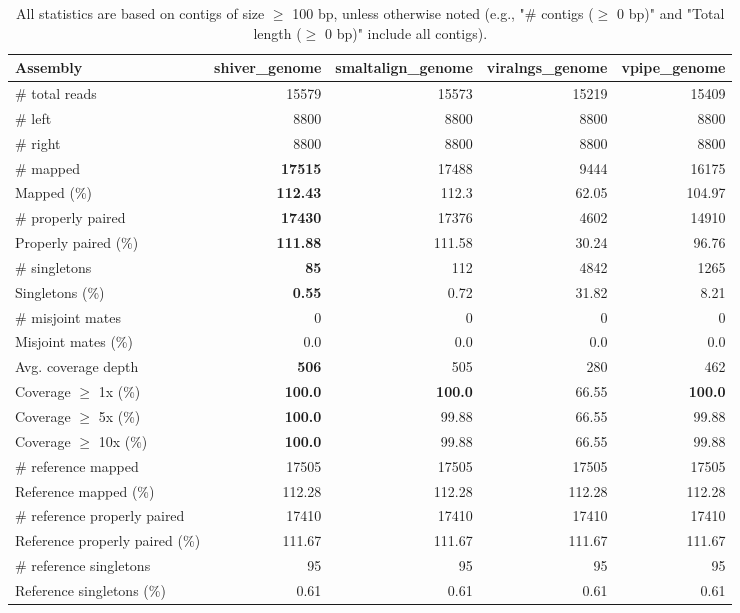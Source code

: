 \documentclass[12pt,a4paper]{article}
\begin{document}
\begin{table}[ht]
\begin{center}
\caption{All statistics are based on contigs of size $\geq$ 100 bp, unless otherwise noted (e.g., "\# contigs ($\geq$ 0 bp)" and "Total length ($\geq$ 0 bp)" include all contigs).}
\begin{tabular}{|l*{4}{|r}|}
\hline
Assembly & shiver\_genome & smaltalign\_genome & viralngs\_genome & vpipe\_genome \\ \hline
\# total reads & 15579 & 15573 & 15219 & 15409 \\ \hline
\# left & 8800 & 8800 & 8800 & 8800 \\ \hline
\# right & 8800 & 8800 & 8800 & 8800 \\ \hline
\# mapped & {\bf 17515} & 17488 & 9444 & 16175 \\ \hline
Mapped (\%) & {\bf 112.43} & 112.3 & 62.05 & 104.97 \\ \hline
\# properly paired & {\bf 17430} & 17376 & 4602 & 14910 \\ \hline
Properly paired (\%) & {\bf 111.88} & 111.58 & 30.24 & 96.76 \\ \hline
\# singletons & {\bf 85} & 112 & 4842 & 1265 \\ \hline
Singletons (\%) & {\bf 0.55} & 0.72 & 31.82 & 8.21 \\ \hline
\# misjoint mates & 0 & 0 & 0 & 0 \\ \hline
Misjoint mates (\%) & 0.0 & 0.0 & 0.0 & 0.0 \\ \hline
Avg. coverage depth & {\bf 506} & 505 & 280 & 462 \\ \hline
Coverage $\geq$ 1x (\%) & {\bf 100.0} & {\bf 100.0} & 66.55 & {\bf 100.0} \\ \hline
Coverage $\geq$ 5x (\%) & {\bf 100.0} & 99.88 & 66.55 & 99.88 \\ \hline
Coverage $\geq$ 10x (\%) & {\bf 100.0} & 99.88 & 66.55 & 99.88 \\ \hline
\# reference mapped & 17505 & 17505 & 17505 & 17505 \\ \hline
Reference mapped (\%) & 112.28 & 112.28 & 112.28 & 112.28 \\ \hline
\# reference properly paired & 17410 & 17410 & 17410 & 17410 \\ \hline
Reference properly paired (\%) & 111.67 & 111.67 & 111.67 & 111.67 \\ \hline
\# reference singletons & 95 & 95 & 95 & 95 \\ \hline
Reference singletons (\%) & 0.61 & 0.61 & 0.61 & 0.61 \\ \hline

\end{tabular}
\end{center}
\end{table}
\end{document}
